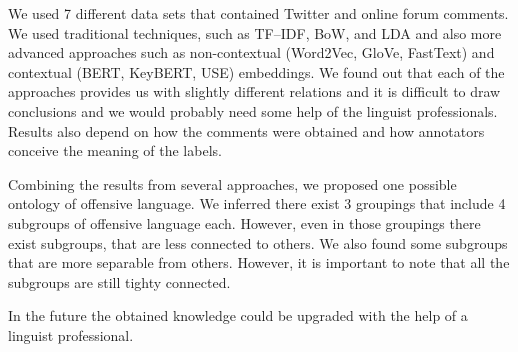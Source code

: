 \documentclass[fleqn,moreauthors,10pt]{ds_report}
\begin{document}
We used 7 different data sets that contained Twitter and online forum comments. We used traditional techniques, such as TF--IDF, BoW, and LDA and also more advanced approaches such as non-contextual (Word2Vec, GloVe, FastText) and contextual (BERT, KeyBERT, USE) embeddings. We found out that each of the approaches provides us with slightly different relations and it is difficult to draw conclusions and we would probably need some help of the linguist professionals. Results also depend on how the comments were obtained and how annotators conceive the meaning of the labels. 

Combining the results from several approaches, we proposed one possible ontology of offensive language.
We inferred there exist 3 groupings that include 4 subgroups of offensive language each. However, even in those groupings there exist subgroups, that are less connected to others. We also found some subgroups that are more separable from others. However, it is important to note that all the subgroups are still tighty connected.

In the future the obtained knowledge could be upgraded with the help of a linguist professional.



\end{document}
